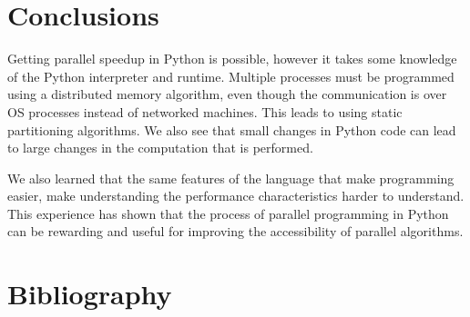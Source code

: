 \documentclass[]{IEEEtran}
\begin{document}
\section{Conclusions}

Getting parallel speedup in Python is possible, however it takes some
knowledge of the Python interpreter and runtime. Multiple processes must
be programmed using a distributed memory algorithm, even though the
communication is over OS processes instead of networked machines. This
leads to using static partitioning algorithms. We also see that small
changes in Python code can lead to large changes in the computation that
is performed.

We also learned that the same features of the language that make
programming easier, make understanding the performance characteristics
harder to understand. This experience has shown that the process of
parallel programming in Python can be rewarding and useful for improving
the accessibility of parallel algorithms.

\section{Bibliography}



\end{document}
